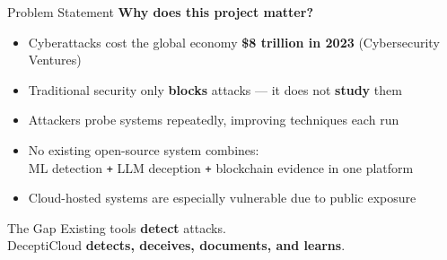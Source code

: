 \documentclass[aspectratio=169,12pt]{beamer}
\begin{document}
\begin{frame}{Problem Statement}
  \textbf{\textcolor{dcRed}{Why does this project matter?}}
  \begin{itemize}
    \item Cyberattacks cost the global economy \textbf{\$8 trillion in 2023} (Cybersecurity Ventures)
    \item Traditional security only \textbf{blocks} attacks --- it does not \textbf{study} them
    \item Attackers probe systems repeatedly, improving techniques each run
    \item No existing open-source system combines:\\[0.2em]
          \hspace{1em}\textcolor{dcCyan}{ML detection}
          \texttt{+} \textcolor{dcGreen}{LLM deception}
          \texttt{+} \textcolor{dcPurple}{blockchain evidence} in one platform
    \item Cloud-hosted systems are especially vulnerable due to public exposure
  \end{itemize}

  \vspace{0.5em}
  \begin{block}{The Gap}
    Existing tools \textbf{detect} attacks.\\
    DeceptiCloud \textbf{detects, deceives, documents, and learns}.
  \end{block}
\end{frame}
\end{document}
